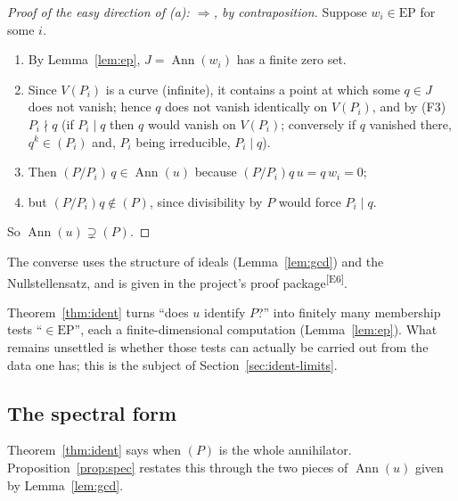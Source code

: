 \documentclass[11pt,a4paper]{article}
\theoremstyle{definition}
\newcommand{\edmark}[1]{\textsuperscript{\textcolor{cB}{\textsf{[#1]}}}}
\newcommand{\Ann}{\operatorname{Ann}}
\newcommand{\EP}{\mathrm{EP}}
\newcommand{\Var}{V}
\begin{document}
\begin{proof}[Proof of the easy direction of (a): $\Rightarrow$, by contraposition]
Suppose $w_i\in\EP$ for some $i$.
\begin{enumerate}[nosep,label=\arabic*.]
\item By Lemma~\ref{lem:ep}, $J=\Ann(w_i)$ has a finite zero set.
\item Since $\Var(P_i)$ is a curve (infinite), it contains a point at which some $q\in J$ does not vanish; hence $q$ does not vanish identically on $\Var(P_i)$, and by (F3) $P_i\nmid q$ (if $P_i\mid q$ then $q$ would vanish on $\Var(P_i)$; conversely if $q$ vanished there, $q^k\in(P_i)$ and, $P_i$ being irreducible, $P_i\mid q$).
\item Then $(P/P_i)\,q\in\Ann(u)$ because $(P/P_i)q\,u=q\,w_i=0$;
\item but $(P/P_i)q\notin(P)$, since divisibility by $P$ would force $P_i\mid q$.
\end{enumerate}
So $\Ann(u)\supsetneq(P)$. \end{proof}
The converse uses the structure of ideals (Lemma~\ref{lem:gcd}) and the Nullstellensatz, and is given in the project's proof package\edmark{E6}.

\begin{takeaway}
Theorem~\ref{thm:ident} turns ``does $u$ identify $P$?'' into finitely many membership tests ``$\in\EP$'', each a finite-dimensional computation (Lemma~\ref{lem:ep}). What remains unsettled is whether those tests can actually be carried out from the data one has; this is the subject of Section~\ref{sec:ident-limits}.
\end{takeaway}



\subsection{The spectral form}\label{sec:spectral}
Theorem~\ref{thm:ident} says when $(P)$ is the whole annihilator. Proposition~\ref{prop:spec} restates this through the two pieces of $\Ann(u)$ given by Lemma~\ref{lem:gcd}.
\end{document}
